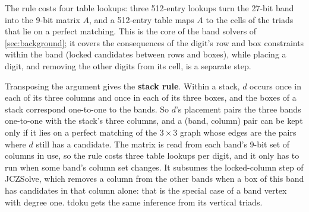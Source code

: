 The rule costs four table lookups: three 512-entry lookups turn the 27-bit band into the 9-bit matrix $A$, and a
512-entry table maps $A$ to the cells of the triads that lie on a perfect matching. This is the core of the band
solvers of \cref{sec:background}; it covers the consequences of the digit's row and box constraints within the band (locked candidates between rows
and boxes), while placing a digit, and removing the other digits from its cell, is a separate step.

Transposing the argument gives the \textbf{stack rule}. Within a stack, $d$ occurs once in each of its three columns
and once in each of its three boxes, and the boxes of a stack correspond one-to-one to the bands. So $d$'s placement pairs the three bands one-to-one with the stack's three columns, and a (band,
column) pair can be kept only if it lies on a
perfect matching of the $3\times 3$ graph whose edges are the pairs where $d$ still has a candidate. The matrix is
read from each band's 9-bit set of columns in use, so the rule costs three table lookups per digit, and it only has
to run when some band's column set changes. It subsumes the locked-column step of JCZSolve, which removes a column
from the other bands when a box of this band has candidates in that column alone: that is the special case of a
band vertex with degree one. tdoku gets the same inference from its vertical triads.

